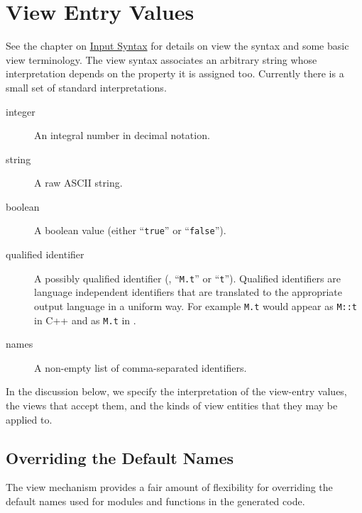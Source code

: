 \section{View Entry Values}

See the chapter on \hyperref[chap:syntax]{Input Syntax} for details on
view the syntax and some basic view terminology.
The view syntax associates
an arbitrary string whose interpretation depends on the property it is
assigned too.
Currently there is a small set of standard interpretations.
%
\begin{description}
  \item[integer]
    An integral number in decimal notation.
  \item[string]
    A raw ASCII string.
  \item[boolean]
    A boolean value (either ``\lstinline!true!'' or ``\lstinline!false!'').
  \item[qualified identifier]
    A possibly qualified identifier (\eg{}, ``\lstinline!M.t!'' or ``\lstinline!t!'').
    Qualified identifiers are language independent
    identifiers that are translated to the appropriate output language in a
    uniform way.
    For example \lstinline!M.t! would appear as \lstinline!M::t! in C++ and as
    \lstinline!M.t! in \sml{}.
  \item[names]
    A non-empty list of comma-separated identifiers.
\end{description}%

In the discussion below, we specify the interpretation of the view-entry values,
the views that accept them, and the kinds of view entities that they may be applied to.

\newcommand{\PROP}[4]{%
  \item[\fbox{\texttt{#1}~~\normalfont\textit{#2}}]\hfill{\fbox{#3 / #4}}\\ }

\subsection{Overriding the Default Names}
The view mechanism provides a fair amount of flexibility for overriding the
default names used for modules and functions in the generated code.

